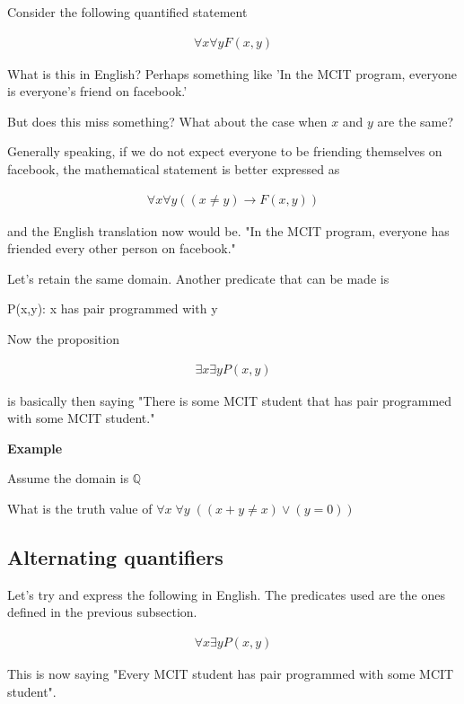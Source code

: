 \documentclass[12pt]{article}
\begin{document}
Consider the following quantified statement

\begin{align*}
\forall x \forall y F(x,y)
\end{align*}

What is this in English? Perhaps something like 'In the MCIT program, everyone is everyone's friend on facebook.'

But does this miss something? What about the case when $x$ and $y$ are the same?

Generally speaking, if we do not expect everyone to be friending themselves on facebook, the mathematical statement is better expressed as

\begin{align*}
\forall x \forall y ( (x \neq y) \rightarrow F(x,y))
\end{align*} 

and the English translation now would be. "In the MCIT program, everyone has friended every other person on facebook."

Let's retain the same domain. Another predicate that can be made is

P(x,y): x has pair programmed with y

Now the proposition 

\begin{align*}
\exists x \exists y P(x,y)
\end{align*}

is basically then saying "There is some MCIT student that has pair programmed with some MCIT student."

\medskip

\textbf{Example}

Assume the domain is $\mathbb{Q}$

What is the truth value of $\forall x \; \forall y \; (( x + y \neq x) \vee (y = 0))$

\subsection*{Alternating quantifiers}

Let's try and express the following in English. The predicates used are the ones defined in the previous subsection.

\begin{align*}
\forall x \exists y P(x,y)
\end{align*}

This is now saying "Every MCIT student has pair programmed with some MCIT student".
\end{document}
